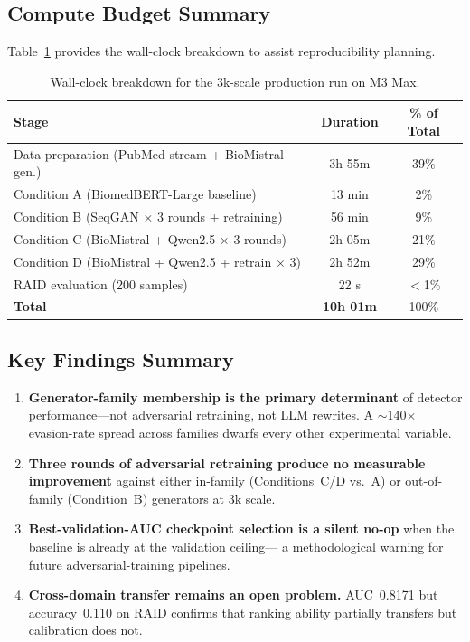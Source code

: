 \documentclass[12pt,a4paper]{article}
\begin{document}
\subsection{Compute Budget Summary}

Table~\ref{tab:compute} provides the wall-clock breakdown to assist
reproducibility planning.

\begin{table}[H]
\centering
\caption{Wall-clock breakdown for the 3k-scale production run on M3 Max.}
\label{tab:compute}
\renewcommand{\arraystretch}{1.25}
\begin{tabular}{@{}lcc@{}}
\toprule
\textbf{Stage} & \textbf{Duration} & \textbf{\% of Total} \\
\midrule
Data preparation (PubMed stream + BioMistral gen.)  & 3h 55m & 39\% \\
Condition A (BiomedBERT-Large baseline)             & 13 min  & 2\%  \\
Condition B (SeqGAN × 3 rounds + retraining)        & 56 min  & 9\%  \\
Condition C (BioMistral + Qwen2.5 × 3 rounds)       & 2h 05m  & 21\% \\
Condition D (BioMistral + Qwen2.5 + retrain × 3)    & 2h 52m  & 29\% \\
RAID evaluation (200 samples)                       & 22 s    & $<$1\% \\
\midrule
\textbf{Total}                                      & \textbf{10h 01m} & 100\% \\
\bottomrule
\end{tabular}
\end{table}

\subsection{Key Findings Summary}

\begin{enumerate}
    \item \textbf{Generator-family membership is the primary determinant}
          of detector performance—not adversarial retraining, not LLM
          rewrites. A $\sim$140$\times$ evasion-rate spread across families
          dwarfs every other experimental variable.
    \item \textbf{Three rounds of adversarial retraining produce no
          measurable improvement} against either in-family (Conditions~C/D
          vs.~A) or out-of-family (Condition~B) generators at 3k scale.
    \item \textbf{Best-validation-AUC checkpoint selection is a silent
          no-op} when the baseline is already at the validation ceiling—
          a methodological warning for future adversarial-training pipelines.
    \item \textbf{Cross-domain transfer remains an open problem.}
          AUC~0.8171 but accuracy~0.110 on RAID confirms that ranking
          ability partially transfers but calibration does not.
\end{enumerate}
\end{document}
